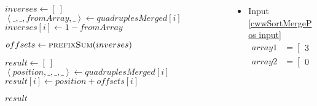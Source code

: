 \begin{frame}[containsverbatim]{\cwwalgortihmexampleframe}
\begin{columns}[c]
\begin{column}{0.35\textwidth}
{\begin{minipage}[c]{\textwidth}
\begin{algorithm}[H]
\begin{algorithmic}[1]
                                            \State $inverses \gets \left[\ \right]$
                                                \State $\left<\_, \_, fromArray, \_\right> \gets quadruplesMerged{\left[i\right]}$
                                                \State $inverses{\left[i\right]} \gets 1 - fromArray$
                                            \EndFor
                                            \label{cwwSortMergePos after inverses}

                                            \label{cwwSortMergePos before offsets}
                                            \State $offsets \gets \Call{prefixSum}{inverses}$
                                            \label{cwwSortMergePos after offsets}
            
                                            \State $result \gets \left[\ \right]$
                                                \State $\left<position, \_, \_, \_\right> \gets quadruplesMerged{\left[i\right]}$
                                                \State $result{\left[i\right]} \gets position + offsets{\left[i\right]}$
                                            \EndFor                             
                                            \label{cwwSortMergePos after result}
                
                                            \State \Return $result$
                                        \EndFunction
                                    \end{algorithmic}
                                \end{algorithm}
                            \endgroup
                        \end{minipage}
                    }
                \end{column}

                \begin{column}{0.65\textwidth}
                    \vspace{-0.2cm}
                    \tiny
                    \begin{multicols}{2}
                        \begin{itemize}
                            \item Input \cref{cwwSortMergePos input}
                            \begin{align*}
                                array1 & = \begin{bmatrix}3 & 5\end{bmatrix} \\
                                array2 & = \begin{bmatrix}0 & 8\end{bmatrix}
                            \end{align*}


\end{itemize}
\end{multicols}
\end{column}
\end{columns}
\end{frame}
